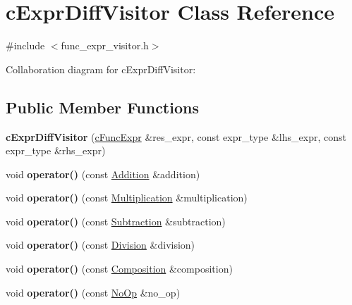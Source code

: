 \hypertarget{classcExprDiffVisitor}{\section{c\-Expr\-Diff\-Visitor Class Reference}
\label{classcExprDiffVisitor}
}


{\ttfamily \#include $<$func\-\_\-expr\-\_\-visitor.\-h$>$}



Collaboration diagram for c\-Expr\-Diff\-Visitor\-:
\subsection*{Public Member Functions}
\begin{DoxyCompactItemize}
\item 
\hypertarget{classcExprDiffVisitor_a94afe65f0cfd3f370d3da012e8250a7f}{{\bfseries c\-Expr\-Diff\-Visitor} (\hyperlink{classcFuncExpr}{c\-Func\-Expr} \&res\-\_\-expr, const expr\-\_\-type \&lhs\-\_\-expr, const expr\-\_\-type \&rhs\-\_\-expr)}\label{classcExprDiffVisitor_a94afe65f0cfd3f370d3da012e8250a7f}

\item 
\hypertarget{classcExprDiffVisitor_a9fe2fb7ec0559e373f9b0cbba94a3552}{void {\bfseries operator()} (const \hyperlink{classAddition}{Addition} \&addition)}\label{classcExprDiffVisitor_a9fe2fb7ec0559e373f9b0cbba94a3552}

\item 
\hypertarget{classcExprDiffVisitor_a0e0c577ae4252f4a018edc9fde106941}{void {\bfseries operator()} (const \hyperlink{classMultiplication}{Multiplication} \&multiplication)}\label{classcExprDiffVisitor_a0e0c577ae4252f4a018edc9fde106941}

\item 
\hypertarget{classcExprDiffVisitor_a6af75b96c9420f17cb39c512d3d5332f}{void {\bfseries operator()} (const \hyperlink{classSubtraction}{Subtraction} \&subtraction)}\label{classcExprDiffVisitor_a6af75b96c9420f17cb39c512d3d5332f}

\item 
\hypertarget{classcExprDiffVisitor_ada15b68409e61a90f025a3c3d89ea293}{void {\bfseries operator()} (const \hyperlink{classDivision}{Division} \&division)}\label{classcExprDiffVisitor_ada15b68409e61a90f025a3c3d89ea293}

\item 
\hypertarget{classcExprDiffVisitor_a4b229ee11763b655aafdef441897fa54}{void {\bfseries operator()} (const \hyperlink{classComposition}{Composition} \&composition)}\label{classcExprDiffVisitor_a4b229ee11763b655aafdef441897fa54}

\item 
\hypertarget{classcExprDiffVisitor_a2b681df9eed2f0e9532faeb4d7193f58}{void {\bfseries operator()} (const \hyperlink{structNoOp}{No\-Op} \&no\-\_\-op)}\label{classcExprDiffVisitor_a2b681df9eed2f0e9532faeb4d7193f58}

\end{DoxyCompactItemize}
